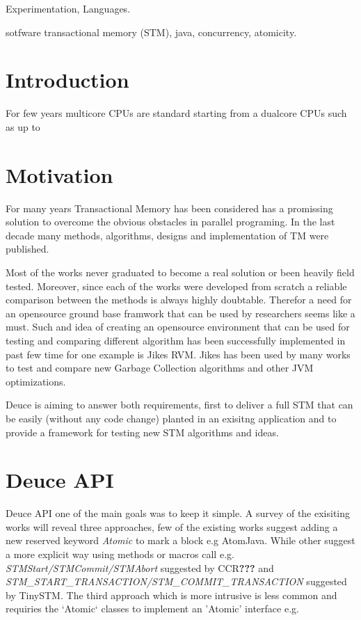 \documentclass[preprint,natbib,10pt]{sigplanconf}
\begin{document}

\terms
Experimentation, Languages.

\keywords
sotfware transactional memory (STM), java, concurrency, atomicity.

\section{Introduction}

For few years multicore CPUs are standard starting from a dualcore CPUs such as  up to 

\section{Motivation}

For many years Transactional Memory has been considered has a promissing solution to overcome the obvious obstacles in parallel programing. In the last decade many methods, algorithms, designs and implementation of TM were published.

Most of the works never graduated to become a real solution or been heavily field tested. Moreover, since each of the works were developed from scratch a reliable comparison between the methods is always highly doubtable. Therefor a need for an opensource ground base framwork that can be used by researchers seems like a must. Such and idea of creating an opensource environment that can be used for testing and comparing different algorithm has been successfully implemented in past few time for one example is Jikes RVM\cite{1086625}. Jikes has been used by many works to test and compare new Garbage Collection algorithms and other JVM optimizations.

Deuce is aiming to answer both requirements, first to deliver a full STM that can be easily (without any code change) planted in an exisitng application and to provide a framework for testing new STM algorithms and ideas.
 

\section{Deuce API}
Deuce API one of the main goals was to keep it simple. A survey of the exisiting works will reveal three approaches, few of the existing works suggest adding a new reserved keyword \textit{Atomic} to mark a block e.g AtomJava\cite{1178611}. 
While other suggest a more explicit way using methods or macros call e.g. \textit{STMStart/STMCommit/STMAbort} suggested by CCR\textbf{???}\cite{949340} and \textit{STM\_START\_TRANSACTION/STM\_COMMIT\_TRANSACTION} suggested by TinySTM\cite{1178611}.
The third approach which is more intrusive is less common and requiries the `Atomic` classes to implement an 'Atomic' interface e.g.
\end{document}
